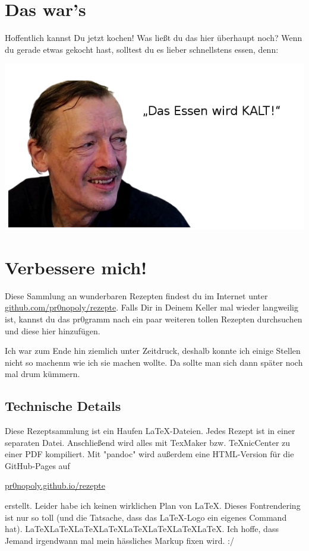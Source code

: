 \section{Das war's}
Hoffentlich kannst Du jetzt kochen! Was ließt du das hier überhaupt noch? Wenn du gerade etwas gekocht hast, solltest du es lieber schnellstens essen, denn:

\includegraphics[width=\textwidth]{_assets/Stoll/Kaltes-Essen.png}

\section{Verbessere mich!}
Diese Sammlung an wunderbaren Rezepten findest du im Internet unter \href{https://github.com/pr0nopoly/rezepte}{github.com/pr0nopoly/rezepte}. Falls Dir in Deinem Keller mal wieder langweilig ist, kannst du das pr0gramm nach ein paar weiteren tollen Rezepten durchsuchen und diese hier hinzufügen.

Ich war zum Ende hin ziemlich unter Zeitdruck, deshalb konnte ich einige Stellen nicht so machenm wie ich sie machen wollte. Da sollte man sich dann später noch mal drum kümmern.

\subsection{Technische Details}
Diese Rezeptsammlung ist ein Haufen \LaTeX-Dateien. Jedes Rezept ist in einer separaten Datei. Anschließend wird alles mit TexMaker bzw. TeXnicCenter zu einer PDF kompiliert. Mit "pandoc"{} wird außerdem eine HTML-Version für die GitHub-Pages auf
\begin{center}
	\href{https://pr0nopoly.github.io/rezepte}{pr0nopoly.github.io/rezepte}
\end{center}
erstellt.
Leider habe ich keinen wirklichen Plan von \LaTeX. Dieses Fontrendering ist nur so toll (und die Tatsache, dass das \LaTeX-Logo ein eigenes Command hat). \LaTeX \LaTeX \LaTeX \LaTeX \LaTeX \LaTeX \LaTeX \LaTeX. Ich hoffe, dass Jemand irgendwann mal mein hässliches Markup fixen wird. :/
